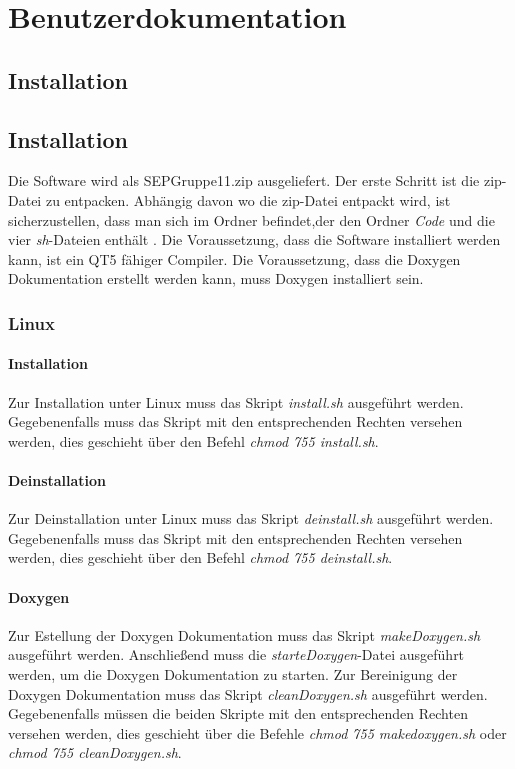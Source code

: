 \chapter{Benutzerdokumentation}

\section{Installation}

\section{Installation}
Die Software wird als SEPGruppe11.zip ausgeliefert. Der erste Schritt ist die zip-Datei zu entpacken. Abhängig davon wo die zip-Datei entpackt wird, ist sicherzustellen, dass man sich im Ordner befindet,der den Ordner \emph{Code} und die vier \emph{sh}-Dateien enthält .
Die Voraussetzung, dass die Software installiert werden kann, ist ein QT5 fähiger Compiler.
Die Voraussetzung, dass die Doxygen Dokumentation erstellt werden kann, muss Doxygen installiert sein.
\subsection{Linux}
\subsubsection{Installation}
Zur Installation unter Linux muss das Skript \emph{install.sh} ausgeführt werden. Gegebenenfalls muss das Skript mit den entsprechenden Rechten versehen werden, dies geschieht über den Befehl \emph{chmod 755 install.sh}.
\subsubsection{Deinstallation}
Zur Deinstallation unter Linux muss das Skript \emph{deinstall.sh} ausgeführt werden. Gegebenenfalls muss das Skript mit den entsprechenden Rechten versehen werden, dies geschieht über den Befehl \emph{chmod 755 deinstall.sh}.
\subsubsection{Doxygen} \label{Installation Doxygen}
Zur Estellung der Doxygen Dokumentation muss das Skript \emph{makeDoxygen.sh} ausgeführt werden. Anschließend muss die \emph{starteDoxygen}-Datei ausgeführt werden, um die Doxygen Dokumentation zu starten. Zur Bereinigung der Doxygen Dokumentation muss das Skript \emph{cleanDoxygen.sh} ausgeführt werden. Gegebenenfalls müssen die beiden Skripte mit den entsprechenden Rechten versehen werden, dies geschieht über die Befehle \emph{chmod 755 makedoxygen.sh} oder \emph{chmod 755 cleanDoxygen.sh}. 

